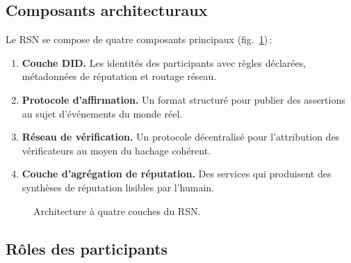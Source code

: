 \documentclass[11pt,a4paper,twocolumn]{article}
\begin{document}
\subsection{Composants architecturaux}

Le RSN se compose de quatre composants principaux (fig.~\ref{fig:architecture})\,:
\begin{enumerate}[nosep]
\item \textbf{Couche DID.} Les identités des participants avec règles déclarées, métadonnées de réputation et routage réseau.
\item \textbf{Protocole d'affirmation.} Un format structuré pour publier des assertions au sujet d'événements du monde réel.
\item \textbf{Réseau de vérification.} Un protocole décentralisé pour l'attribution des vérificateurs au moyen du hachage cohérent.
\item \textbf{Couche d'agrégation de réputation.} Des services qui produisent des synthèses de réputation lisibles par l'humain.
\end{enumerate}

\begin{figure}[ht]
\centering
{}
\caption{Architecture à quatre couches du RSN.}
\label{fig:architecture}
\end{figure}

\subsection{Rôles des participants}
\end{document}
